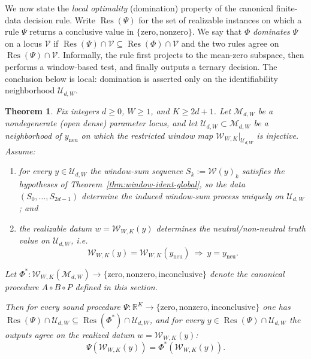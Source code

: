 \documentclass[11pt,reqno]{amsart}
\newtheorem{theorem}{Theorem}[section]
\theoremstyle{definition}
\theoremstyle{remark}
\newcommand{\R}{\mathbb{R}}
\newcommand{\1}{\mathbf{1}}
\newcommand{\zero}{\mathrm{zero}}
\newcommand{\nonzero}{\mathrm{nonzero}}
\newcommand{\inconclusive}{\mathrm{inconclusive}}
\begin{document}
We now state the \emph{local optimality} (domination) property of the canonical finite-data decision rule.
Write $\operatorname{Res}(\Psi)$ for the set of realizable instances on which a rule $\Psi$ returns a conclusive value in $\{\zero,\nonzero\}$.
We say that $\Phi$ \emph{dominates} $\Psi$ on a locus $\mathcal{V}$ if $\operatorname{Res}(\Psi)\cap\mathcal{V}\subseteq\operatorname{Res}(\Phi)\cap\mathcal{V}$ and the two rules agree on $\operatorname{Res}(\Psi)\cap\mathcal{V}$.
Informally, the rule first projects to the mean-zero subspace, then performs a window-based test, and finally outputs a ternary decision. The conclusion below is local: domination is asserted only on the identifiability neighborhood $\mathcal{U}_{d,W}$.

\begin{theorem}\label{thm:domination}
Fix integers $d\ge 0$, $W\ge 1$, and $K\ge 2d+1$.
Let $\mathcal{M}_{d,W}$ be a nondegenerate (open dense) parameter locus, and let
$\mathcal{U}_{d,W}\subset\mathcal{M}_{d,W}$ be a neighborhood of $y_{\mathrm{neu}}$ on which the restricted window map
$\mathcal{W}_{W,K}\vert_{\mathcal{U}_{d,W}}$ is injective.
Assume:


\begin{enumerate}[label=\textup{(\alph*)},leftmargin=2.2em]
\item for every $y\in\mathcal{U}_{d,W}$ the window-sum sequence $S_k:=\mathcal{W}(y)_k$ satisfies the hypotheses of Theorem~\ref{thm:window-ident-global}, so the data $(S_0,\dots,S_{2d-1})$ determine the induced window-sum process uniquely on $\mathcal{U}_{d,W}$; and
\item the realizable datum $w=\mathcal{W}_{W,K}(y)$ determines the neutral/non-neutral truth value on $\mathcal{U}_{d,W}$, i.e.
\[
\mathcal{W}_{W,K}(y)=\mathcal{W}_{W,K}(y_{\mathrm{neu}})\ \Longrightarrow\ y=y_{\mathrm{neu}}.
\]
\end{enumerate}

Let $\Phi^\ast:\mathcal{W}_{W,K}(\mathcal{M}_{d,W})\to\{\zero,\nonzero,\inconclusive\}$ denote the canonical procedure $A\circ B\circ P$ defined in this section.

Then for every sound procedure $\Psi:\R^K\to\{\zero,\nonzero,\inconclusive\}$ one has
$\operatorname{Res}(\Psi)\cap\mathcal{U}_{d,W}\subseteq \operatorname{Res}(\Phi^\ast)\cap\mathcal{U}_{d,W}$, and for every
$y\in\operatorname{Res}(\Psi)\cap\mathcal{U}_{d,W}$ the outputs agree on the realized datum $w=\mathcal{W}_{W,K}(y)$:
\[
\Psi(\mathcal{W}_{W,K}(y))=\Phi^\ast(\mathcal{W}_{W,K}(y)).
\]

\end{theorem}
\end{document}
